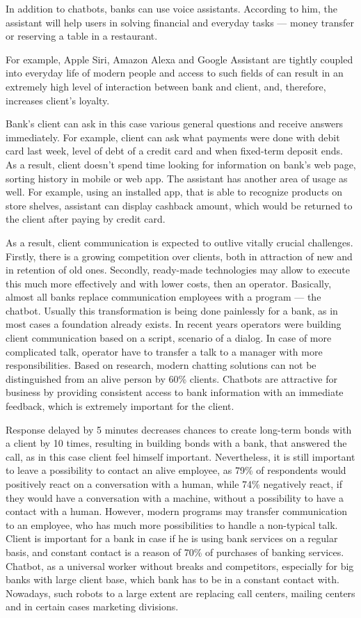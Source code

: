 In addition to chatbots, banks can use voice assistants.
According to him, the assistant will help users in solving financial and everyday tasks — money transfer or reserving a table in a restaurant.

For example, Apple Siri, Amazon Alexa and Google Assistant are tightly coupled into everyday life of modern people and access to such fields of can result in an extremely high level of interaction between bank and client, and, therefore, increases client's loyalty. 

Bank's client can ask in this case various general questions and receive answers immediately.
For example, client can ask what payments were done with debit card last week, 
level of debt of a credit card and when fixed-term deposit ends.
As a result, client doesn't spend time looking for information on bank's web page, sorting history in mobile or web app.
The assistant has another area of usage as well. 
For example, using an installed app, that is able to recognize products on store shelves, assistant can display cashback amount, which would be returned to the client after paying by credit card.

As a result, client communication is expected to outlive vitally crucial challenges. 
Firstly, there is a growing competition over clients, both in attraction of new and in retention of old ones.
Secondly, ready-made technologies may allow to execute this much more effectively and with lower costs, then an operator.
Basically, almost all banks replace communication employees with a program — the chatbot.
Usually this transformation is being done painlessly for a bank, as in most cases a foundation already exists.
In recent years operators were building client communication based on a script, scenario of a dialog.
In case of more complicated talk, operator have to transfer a talk to a manager with more responsibilities.
Based on research, modern chatting solutions can not be distinguished from an alive person by 60\% clients.
Chatbots are attractive for business by providing consistent access to bank information with an immediate feedback, which is extremely important for the client.

Response delayed by 5 minutes decreases chances to create long-term bonds with a client by 10 times, resulting in building bonds with a bank, that answered the call, as in this case client feel himself important. 
Nevertheless, it is still important to leave a possibility to contact an alive employee, as 79\% of respondents would positively react on a conversation with a human,
while 74\% negatively react, if they would have a conversation with a machine, without a possibility to have a contact with a human.
However, modern programs may transfer communication to an employee, who has much more possibilities to handle a non-typical talk.
Client is important for a bank in case if he is using bank services on a regular basis, and constant contact is a reason of 70\% of purchases of banking services.
Chatbot, as a universal worker without breaks and competitors, especially for big banks with large client base, which bank has to be in a constant contact with.
Nowadays, such robots to a large extent are replacing call centers, mailing centers and in certain cases marketing divisions.

